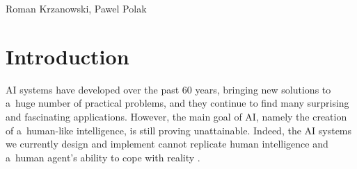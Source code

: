 \begin{artengenv2auth}{Roman Krzanowski, Pawel Polak}
%
%
%
%

\section{Introduction}
AI systems have developed over the past 60 years, bringing new solutions to a~huge number of practical problems, and they continue to find many surprising and fascinating applications. However, the main goal of AI, namely the creation of a~human-like intelligence,  is still proving unattainable. Indeed, the
AI systems we currently design and implement cannot replicate human intelligence and a~human agent's ability to cope with reality
\parencites[see, e.g.,][]{brooks_intelligence_1991}[][]{minsky_logical_1991}[][]{dreyfus_skillful_2016}[][]{mitchell_artificial_2019}[][]{boltuc_conscious_2020}[][]{roitblat_algorithms_2020}[][]{wooldridge_road_2021}.%



\end{artengenv2auth}
